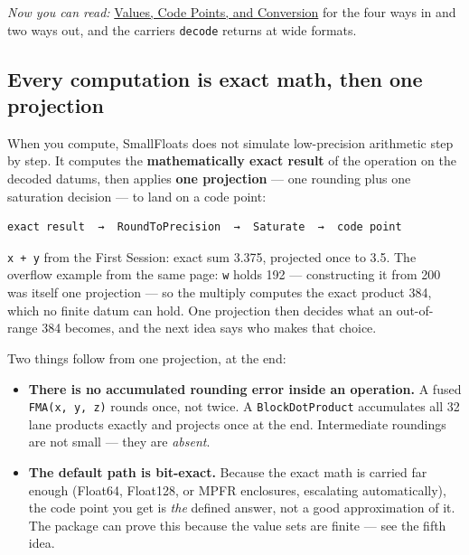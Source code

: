 \emph{Now you can read:} \href{concept\_\allowbreak{}values\_\allowbreak{}codepoints.md}{Values, Code Points, and Conversion} for the four ways in and two ways out, and the carriers \texttt{decode} returns at wide formats.



\subsection{Every computation is exact math, then one projection}



\label{1660382460976176104}{}


When you compute, SmallFloats does not simulate low-precision arithmetic step by step. It computes the \textbf{mathematically exact result} of the operation on the decoded datums, then applies \textbf{one projection} — one rounding plus one saturation decision — to land on a code point:




\nopagebreak[4]
\begin{verbatim}
exact result  →  RoundToPrecision  →  Saturate  →  code point
\end{verbatim}



\texttt{x + y} from the First Session: exact sum 3.375, projected once to 3.5. The overflow example from the same page: \texttt{w} holds 192 — constructing it from 200 was itself one projection — so the multiply computes the exact product 384, which no finite datum can hold. One projection then decides what an out-of-range 384 becomes, and the next idea says who makes that choice.



Two things follow from {\textquotedbl}one projection, at the end{\textquotedbl}:



\begin{itemize}
\item \textbf{There is no accumulated rounding error inside an operation.} A fused \texttt{FMA(x, y, z)} rounds once, not twice. A \texttt{BlockDotProduct} accumulates all 32 lane products exactly and projects once at the end. Intermediate roundings are not {\textquotedbl}small{\textquotedbl} — they are \emph{absent}.


\item \textbf{The default path is bit-exact.} Because the exact math is carried far enough (Float64, Float128, or MPFR enclosures, escalating automatically), the code point you get is \emph{the} defined answer, not a good approximation of it. The package can prove this because the value sets are finite — see the fifth idea.

\end{itemize}


